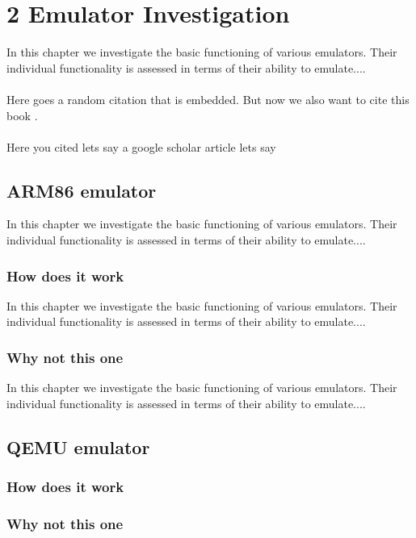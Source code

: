 \chapter*{2 Emulator Investigation}
\setcounter{chapter}{2}
\label{emul}
In this chapter we investigate the basic functioning of various emulators. Their individual functionality is assessed in terms of their ability to emulate....
\\\\
Here goes a random citation \cite{Sweigart2015} that is embedded. But now we also want to cite this book  \cite{Romero}.
\\\\
Here you cited lets say a google scholar article lets say \cite{Hashim}

\section{ARM86 emulator}
In this chapter we investigate the basic functioning of various emulators. Their individual functionality is assessed in terms of their ability to emulate....
\label{ARM86emu}

	\subsection{How does it work}
	In this chapter we investigate the basic functioning of 		various emulators. Their individual functionality is 			assessed in terms of their ability to emulate....
	
	\subsection{Why not this one}
	In this chapter we investigate the basic functioning of 		various emulators. Their individual functionality is 			assessed in terms of their ability to emulate....

\section{QEMU emulator}
\label{QEMUemu}

	\subsection{How does it work}
	\subsection{Why not this one}





